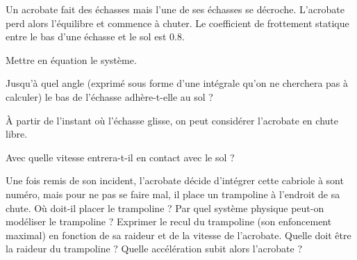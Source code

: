 

Un acrobate fait des échasses mais l'une de ses échasses se décroche. L'acrobate perd alors l'équilibre et commence à chuter. Le coefficient de frottement statique entre le bas d'une échasse et le sol est \SI{0.8}{}.

\question Mettre en équation le système.

\question Jusqu'à quel angle (exprimé sous forme d'une intégrale qu'on ne cherchera pas à calculer) le bas de l'échasse adhère-t-elle au sol ?

À partir de l'instant où l'échasse glisse, on peut considérer l'acrobate en chute libre.

\question Avec quelle vitesse entrera-t-il en contact avec le sol ?

\question Une fois remis de son incident, l'acrobate décide d'intégrer cette cabriole à sont numéro, mais pour ne pas se faire mal, il place un trampoline à l'endroit de sa chute.
\subquestion Où doit-il placer le trampoline ?
\subquestion Par quel système physique peut-on modéliser le trampoline ?
\subquestion Exprimer le recul du trampoline (son enfoncement maximal) en fonction de sa raideur et de la vitesse de l'acrobate.
\subquestion Quelle doit être la raideur du trampoline ?
\subquestion Quelle accélération subit alors l'acrobate ?

